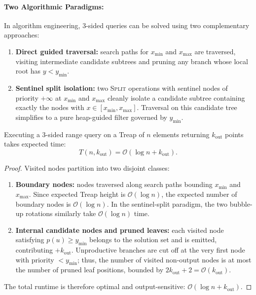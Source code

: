 \paragraph{Two Algorithmic Paradigms:}
In algorithm engineering, 3-sided queries can be solved using two complementary approaches:
\begin{enumerate}
    \item \textbf{Direct guided traversal:} search paths for $x_{\min}$ and $x_{\max}$ are traversed, visiting intermediate candidate subtrees and pruning any branch whose local root has $y < y_{\min}$.
    \item \textbf{Sentinel split isolation:} two \textsc{Split} operations with sentinel nodes of priority $+\infty$ at $x_{\min}$ and $x_{\max}$ cleanly isolate a candidate subtree containing exactly the nodes with $x \in [x_{\min}, x_{\max}]$. Traversal on this candidate tree simplifies to a pure heap-guided filter governed by $y_{\min}$.
\end{enumerate}

\begin{theorem}
Executing a 3-sided range query on a Treap of $n$ elements returning $k_{\text{out}}$ points takes expected time:
\begin{equation}
  T(n, k_{\text{out}}) = \mathcal{O}(\log n + k_{\text{out}}).
\end{equation}
\end{theorem}

\begin{proof}
Visited nodes partition into two disjoint classes:
\begin{enumerate}
    \item \textbf{Boundary nodes:} nodes traversed along search paths bounding $x_{\min}$ and $x_{\max}$. Since expected Treap height is $\mathcal{O}(\log n)$, the expected number of boundary nodes is $\mathcal{O}(\log n)$. In the sentinel-split paradigm, the two bubble-up rotations similarly take $\mathcal{O}(\log n)$ time.
    \item \textbf{Internal candidate nodes and pruned leaves:} each visited node satisfying $p(u) \ge y_{\min}$ belongs to the solution set and is emitted, contributing $+k_{\text{out}}$. Unproductive branches are cut off at the very first node with priority $< y_{\min}$; thus, the number of visited non-output nodes is at most the number of pruned leaf positions, bounded by $2 k_{\text{out}} + 2 = \mathcal{O}(k_{\text{out}})$.
\end{enumerate}
The total runtime is therefore optimal and output-sensitive: $\mathcal{O}(\log n + k_{\text{out}})$.
\end{proof}

